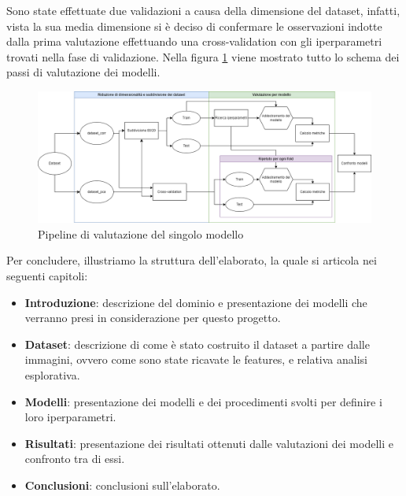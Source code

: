 Sono state effettuate due validazioni a causa della dimensione del dataset,
infatti, vista la sua media dimensione si è deciso di confermare le osservazioni
indotte dalla prima valutazione effettuando una cross-validation con gli
iperparametri trovati nella fase di validazione. Nella figura \ref{fig:pipeline}
viene mostrato tutto lo schema dei passi di valutazione dei modelli.
\begin{figure}[!ht]
      \centering
      \includegraphics[width=\textwidth]{img/introduzione/schema_pipeline_valutazione_modelli.png}
      \caption{Pipeline di valutazione del singolo modello}
      \label{fig:pipeline}
\end{figure}

Per concludere, illustriamo la struttura dell'elaborato, la quale si articola
nei seguenti capitoli:
\begin{itemize}
      \item \textbf{Introduzione}: descrizione del dominio e presentazione dei
            modelli che verranno presi in considerazione per questo progetto.
      \item \textbf{Dataset}: descrizione di come è stato costruito il dataset a
            partire dalle immagini, ovvero come sono state ricavate le features,
            e relativa analisi esplorativa.
      \item \textbf{Modelli}: presentazione dei modelli e dei procedimenti svolti
            per definire i loro iperparametri.
      \item \textbf{Risultati}: presentazione dei risultati ottenuti dalle valutazioni
            dei modelli e confronto tra di essi.
      \item \textbf{Conclusioni}: conclusioni sull'elaborato.
\end{itemize}